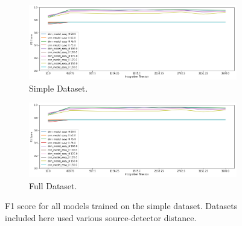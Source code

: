 \begin{figure}[H]
     \centering
     \begin{subfigure}[b]{0.9\textwidth}
         \centering
         \includegraphics[width=\textwidth]{images/results_easy_distance_comparison}
         \caption{Simple Dataset.}
         \label{fig:results_easy_distance_comparison_simple}
     \end{subfigure}

     \begin{subfigure}[b]{0.9\textwidth}
         \centering
         \includegraphics[width=\textwidth]{images/results_easy_distance_comparison}
         \caption{Full Dataset.}
         \label{fig:results_easy_distance_comparison_full}
     \end{subfigure}
        \caption{F1 score for all models trained on the simple dataset. Datasets included here used various source-detector distance.}
        \label{fig:results_easy_distance_comparison}
\end{figure}

